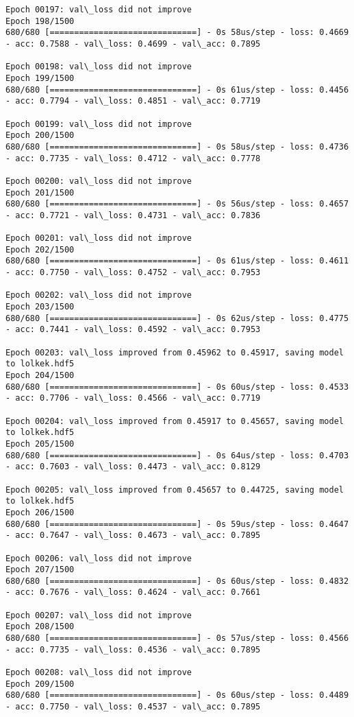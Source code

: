 \documentclass[11pt]{article}
\begin{document}
\begin{Verbatim}[commandchars=\\\{\}]
Epoch 00197: val\_loss did not improve
Epoch 198/1500
680/680 [==============================] - 0s 58us/step - loss: 0.4669 - acc: 0.7588 - val\_loss: 0.4699 - val\_acc: 0.7895

Epoch 00198: val\_loss did not improve
Epoch 199/1500
680/680 [==============================] - 0s 61us/step - loss: 0.4456 - acc: 0.7794 - val\_loss: 0.4851 - val\_acc: 0.7719

Epoch 00199: val\_loss did not improve
Epoch 200/1500
680/680 [==============================] - 0s 58us/step - loss: 0.4736 - acc: 0.7735 - val\_loss: 0.4712 - val\_acc: 0.7778

Epoch 00200: val\_loss did not improve
Epoch 201/1500
680/680 [==============================] - 0s 56us/step - loss: 0.4657 - acc: 0.7721 - val\_loss: 0.4731 - val\_acc: 0.7836

Epoch 00201: val\_loss did not improve
Epoch 202/1500
680/680 [==============================] - 0s 61us/step - loss: 0.4611 - acc: 0.7750 - val\_loss: 0.4752 - val\_acc: 0.7953

Epoch 00202: val\_loss did not improve
Epoch 203/1500
680/680 [==============================] - 0s 62us/step - loss: 0.4775 - acc: 0.7441 - val\_loss: 0.4592 - val\_acc: 0.7953

Epoch 00203: val\_loss improved from 0.45962 to 0.45917, saving model to lolkek.hdf5
Epoch 204/1500
680/680 [==============================] - 0s 60us/step - loss: 0.4533 - acc: 0.7706 - val\_loss: 0.4566 - val\_acc: 0.7719

Epoch 00204: val\_loss improved from 0.45917 to 0.45657, saving model to lolkek.hdf5
Epoch 205/1500
680/680 [==============================] - 0s 64us/step - loss: 0.4703 - acc: 0.7603 - val\_loss: 0.4473 - val\_acc: 0.8129

Epoch 00205: val\_loss improved from 0.45657 to 0.44725, saving model to lolkek.hdf5
Epoch 206/1500
680/680 [==============================] - 0s 59us/step - loss: 0.4647 - acc: 0.7647 - val\_loss: 0.4673 - val\_acc: 0.7895

Epoch 00206: val\_loss did not improve
Epoch 207/1500
680/680 [==============================] - 0s 60us/step - loss: 0.4832 - acc: 0.7676 - val\_loss: 0.4624 - val\_acc: 0.7661

Epoch 00207: val\_loss did not improve
Epoch 208/1500
680/680 [==============================] - 0s 57us/step - loss: 0.4566 - acc: 0.7735 - val\_loss: 0.4536 - val\_acc: 0.7895

Epoch 00208: val\_loss did not improve
Epoch 209/1500
680/680 [==============================] - 0s 60us/step - loss: 0.4489 - acc: 0.7750 - val\_loss: 0.4537 - val\_acc: 0.7895


\end{Verbatim}
\end{document}
